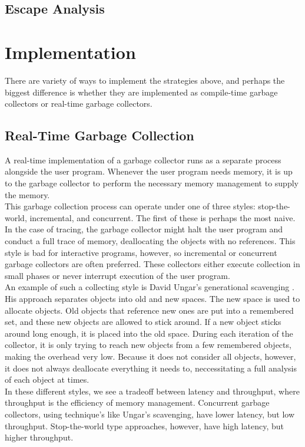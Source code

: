 \documentclass[12pt]{article}
\begin{document}
\subsection{Escape Analysis}

\section{Implementation}
There are variety of ways to implement the strategies above, and perhaps the biggest difference is whether they are implemented as compile-time garbage collectors or real-time garbage collectors.
\subsection{Real-Time Garbage Collection}
A real-time implementation of a garbage collector runs as a separate process alongside the user program. Whenever the user program needs memory, it is up to the garbage collector to perform the necessary memory management to supply the memory. \\

This garbage collection process can operate under one of three styles: stop-the-world, incremental, and concurrent. The first of these is perhaps the most naive. In the case of tracing, the garbage collector might halt the user program and conduct a full trace of memory, deallocating the objects with no references. This style is bad for interactive programs, however, so incremental or concurrent garbage collectors are often preferred. These collectors either execute collection in small phases or never interrupt execution of the user program. \\

An example of such a collecting style is David Ungar's generational scavenging \cite{ungar}. His approach separates objects into old and new spaces. The new space is used to allocate objects. Old objects that reference new ones are put into a remembered set, and these new objects are allowed to stick around. If a new object sticks around long enough, it is placed into the old space. During each iteration of the collector, it is only trying to reach new objects from a few remembered objects, making the overhead very low. Because it does not consider all objects, however, it does not always deallocate everything it needs to, neccessitating a full analysis of each object at times. \\


In these different styles,  we see a tradeoff between latency and throughput, where throughput is the efficiency of memory management. Concurrent garbage collectors, using technique's like Ungar's scavenging, have lower latency, but low throughput. Stop-the-world type approaches, however, have high latency, but higher throughput.
\end{document}
